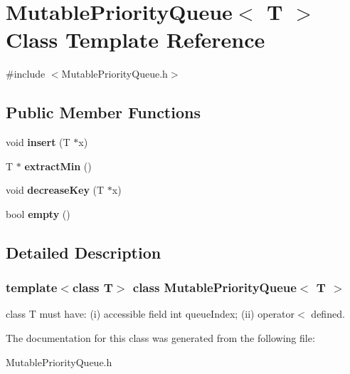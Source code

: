 \hypertarget{class_mutable_priority_queue}{}\section{Mutable\+Priority\+Queue$<$ T $>$ Class Template Reference}
\label{class_mutable_priority_queue}


{\ttfamily \#include $<$Mutable\+Priority\+Queue.\+h$>$}

\subsection*{Public Member Functions}
\begin{DoxyCompactItemize}
\item 
\mbox{\label{class_mutable_priority_queue_a058fc182052af82e10cc3719e448b62d}} 
void {\bfseries insert} (T $\ast$x)
\item 
\mbox{\label{class_mutable_priority_queue_a3880874d7364279ac0d6d31302b28853}} 
T $\ast$ {\bfseries extract\+Min} ()
\item 
\mbox{\label{class_mutable_priority_queue_a0878839cc1d2dba2b8ab2e589ecc6405}} 
void {\bfseries decrease\+Key} (T $\ast$x)
\item 
\mbox{\label{class_mutable_priority_queue_a2edbb1f4a6fa3ff735700dfcebebe8d4}} 
bool {\bfseries empty} ()
\end{DoxyCompactItemize}


\subsection{Detailed Description}
\subsubsection*{template$<$class T$>$\newline
class Mutable\+Priority\+Queue$<$ T $>$}

class T must have\+: (i) accessible field int queue\+Index; (ii) operator$<$ defined. 

The documentation for this class was generated from the following file\+:\begin{DoxyCompactItemize}
\item 
Mutable\+Priority\+Queue.\+h\end{DoxyCompactItemize}
